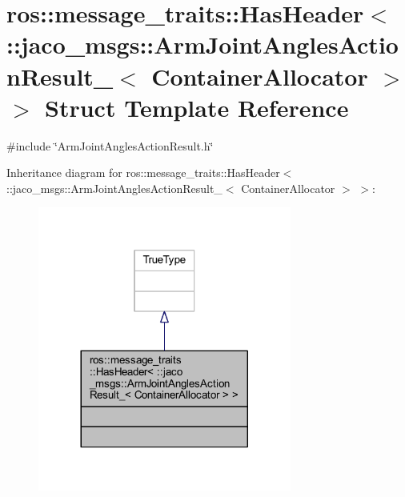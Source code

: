 \hypertarget{structros_1_1message__traits_1_1HasHeader_3_01_1_1jaco__msgs_1_1ArmJointAnglesActionResult___3_01ContainerAllocator_01_4_01_4}{}\section{ros\+:\+:message\+\_\+traits\+:\+:Has\+Header$<$ \+:\+:jaco\+\_\+msgs\+:\+:Arm\+Joint\+Angles\+Action\+Result\+\_\+$<$ Container\+Allocator $>$ $>$ Struct Template Reference}
\label{structros_1_1message__traits_1_1HasHeader_3_01_1_1jaco__msgs_1_1ArmJointAnglesActionResult___3_01ContainerAllocator_01_4_01_4}


{\ttfamily \#include \char`\"{}Arm\+Joint\+Angles\+Action\+Result.\+h\char`\"{}}



Inheritance diagram for ros\+:\+:message\+\_\+traits\+:\+:Has\+Header$<$ \+:\+:jaco\+\_\+msgs\+:\+:Arm\+Joint\+Angles\+Action\+Result\+\_\+$<$ Container\+Allocator $>$ $>$\+:
\nopagebreak
\begin{figure}[H]
\begin{center}
\leavevmode
\includegraphics[width=236pt]{de/df5/structros_1_1message__traits_1_1HasHeader_3_01_1_1jaco__msgs_1_1ArmJointAnglesActionResult___3_0663dbcf87d8cbd824fac8291dd812e4e}
\end{center}
\end{figure}


